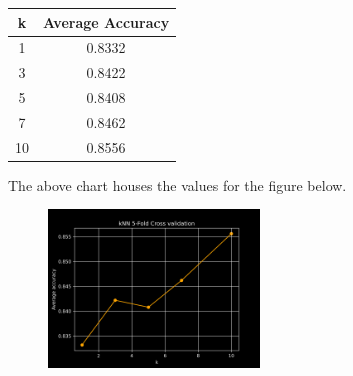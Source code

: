 \documentclass[a4paper]{article}
\theoremstyle{definition}
\newenvironment{soln}{
    \leavevmode\color{blue}\ignorespaces
}{}
\begin{document}
\begin{enumerate}
	\begin{soln}
             \begin{table}[H]
                \begin{soln}
                \begin{center}
                \begin{tabular}{c|c}
                \hline
                \textbf{k} & \textbf{Average Accuracy} \\ \hline
                1          & 0.8332                    \\ 
                3          & 0.8422                    \\ 
                5          & 0.8408                    \\ 
                7          & 0.8462                    \\ 
                10         & 0.8556                    \\ \hline
                \end{tabular}
             \end{center}
            \end{soln}
             \end{table}
             \centering The above chart houses the values for the figure below.
             \begin{figure}[H]
                \centering
                \includegraphics[width=0.5\textwidth]{figs/q2/p4/kNN_5-Fold_Cross_validation.png} 
                \captionsetup{labelformat=empty}
                \caption{}
                \label{fig:my_label}
             \end{figure}
        \end{soln}
	

\end{enumerate}
\end{document}
